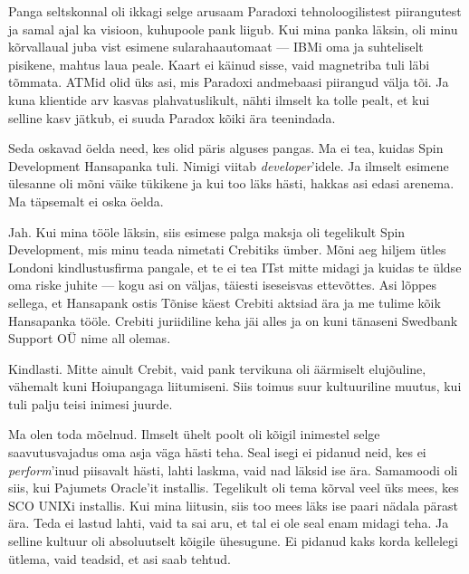 
Panga seltskonnal oli ikkagi selge arusaam Paradoxi 
tehnoloogilistest piirangutest ja samal ajal ka visioon, kuhupoole 
pank liigub. Kui mina panka läksin, 
oli minu kõrvallaual juba vist esimene sularahaautomaat --- IBMi oma ja
suhteliselt pisikene, mahtus laua peale. Kaart ei käinud 
sisse, vaid magnetriba tuli läbi tõmmata. ATMid olid 
üks asi, mis Paradoxi andmebaasi piirangud välja tõi. Ja kuna 
klientide arv kasvas plahvatuslikult, nähti ilmselt ka tolle pealt, et kui selline kasv jätkub, ei suuda
Paradox kõiki ära teenindada.


Seda oskavad öelda need, kes olid päris alguses pangas. Ma ei 
tea, kuidas Spin Development Hansapanka tuli. 
Nimigi viitab \emph{developer}'idele. Ja 
ilmselt esimene ülesanne oli mõni väike tükikene ja 
kui too läks hästi, hakkas asi edasi arenema. Ma täpsemalt ei oska öelda.


Jah. Kui mina tööle läksin, siis esimese palga maksja oli tegelikult Spin 
Development, mis minu teada nimetati 
Crebitiks ümber. Mõni aeg hiljem ütles Londoni 
kindlustusfirma pangale, et te ei tea ITst mitte midagi ja kuidas te üldse oma riske juhite --- kogu 
asi on väljas, täiesti iseseisvas ettevõttes. Asi lõppes sellega, et Hansapank ostis Tõnise käest 
Crebiti aktsiad ära ja me tulime kõik Hansapanka tööle. Crebiti 
juriidiline keha jäi alles ja on kuni tänaseni Swedbank Support OÜ nime 
all olemas.


Kindlasti. Mitte ainult Crebit, vaid pank tervikuna oli 
äärmiselt elujõuline, vähemalt kuni 
Hoiupangaga liitumiseni. Siis toimus suur kultuuriline 
muutus, kui tuli palju teisi inimesi juurde.


Ma olen toda mõelnud. Ilmselt ühelt poolt oli kõigil inimestel selge saavutusvajadus oma asja väga hästi teha. Seal 
isegi ei pidanud neid, kes ei \emph{perform}'inud 
piisavalt hästi, lahti laskma, vaid nad läksid ise ära. Samamoodi oli siis, kui 
Pajumets Oracle'it installis. 
Tegelikult oli tema kõrval veel üks mees, kes SCO UNIXi installis. 
Kui mina liitusin, siis too mees läks ise paari nädala pärast 
ära. Teda ei lastud lahti, vaid ta sai aru, et tal ei ole seal enam midagi teha. Ja selline kultuur 
oli absoluutselt kõigile ühesugune. Ei pidanud kaks korda kellelegi ütlema, 
vaid teadsid, et asi saab tehtud.

